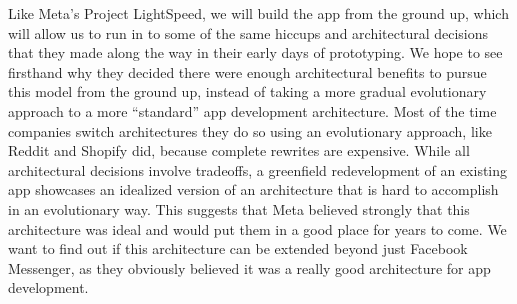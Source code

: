 \documentclass[12pt]{article}
\begin{document}
    Like Meta's Project LightSpeed, we will build the app from the ground up, which will allow us to run in to some of the same hiccups and architectural decisions that they made along the way in their early days of prototyping.
    We hope to see firsthand why they decided there were enough architectural benefits to pursue this model from the ground up, instead of taking a more gradual evolutionary approach to a more “standard” app development architecture.
    Most of the time companies switch architectures they do so using an evolutionary approach, like Reddit and Shopify did, because complete rewrites are expensive.
    While all architectural decisions involve tradeoffs, a greenfield redevelopment of an existing app showcases an idealized version of an architecture that is hard to accomplish in an evolutionary way.
    This suggests that Meta believed strongly that this architecture was ideal and would put them in a good place for years to come.
    We want to find out if this architecture can be extended beyond just Facebook Messenger, as they obviously believed it was a really good architecture for app development.

\end{document}
